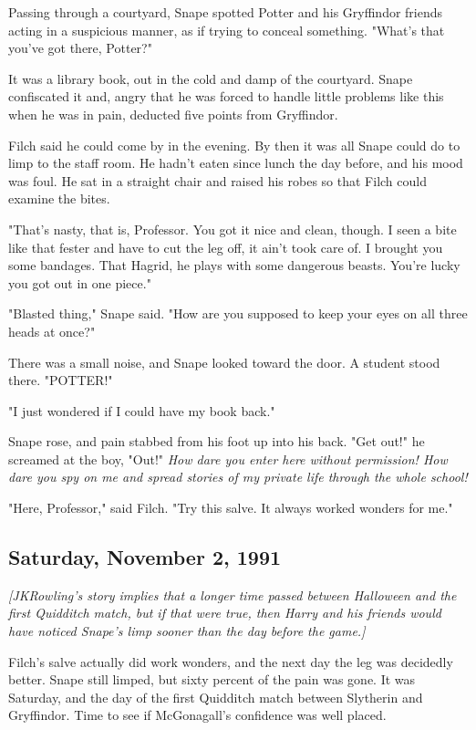 Passing through a courtyard, Snape spotted Potter and his Gryffindor friends acting in a suspicious manner, as if trying to conceal something. "What's that you've got there, Potter?"

It was a library book, out in the cold and damp of the courtyard. Snape confiscated it and, angry that he was forced to handle little problems like this when he was in pain, deducted five points from Gryffindor.

Filch said he could come by in the evening. By then it was all Snape could do to limp to the staff room. He hadn't eaten since lunch the day before, and his mood was foul. He sat in a straight chair and raised his robes so that Filch could examine the bites.

"That's nasty, that is, Professor. You got it nice and clean, though. I seen a bite like that fester and have to cut the leg off, it ain't took care of. I brought you some bandages. That Hagrid, he plays with some dangerous beasts. You're lucky you got out in one piece."

"Blasted thing," Snape said. "How are you supposed to keep your eyes on all three heads at once?"

There was a small noise, and Snape looked toward the door. A student stood there. "POTTER!"

"I just wondered if I could have my book back."

Snape rose, and pain stabbed from his foot up into his back. "Get out!" he screamed at the boy, "Out!" \emph{How dare you enter here without permission! How dare you spy on me and spread stories of my private life through the whole school!}

"Here, Professor," said Filch. "Try this salve. It always worked wonders for me."

\subsection{Saturday, November 2, 1991}

\emph{[JKRowling's story implies that a longer time passed between Halloween and the first Quidditch match, but if that were true, then Harry and his friends would have noticed Snape's limp sooner than the day before the game.]}

Filch's salve actually did work wonders, and the next day the leg was decidedly better. Snape still limped, but sixty percent of the pain was gone. It was Saturday, and the day of the first Quidditch match between Slytherin and Gryffindor. Time to see if McGonagall's confidence was well placed.


